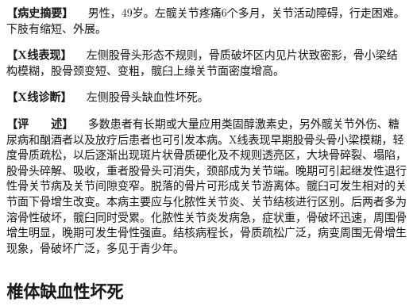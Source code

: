 \textbf{【病史摘要】}
　男性，49岁。左髋关节疼痛6个多月，关节活动障碍，行走困难。下肢有缩短、外展。

\textbf{【X线表现】}
　左侧股骨头形态不规则，骨质破坏区内见片状致密影，骨小梁结构模糊，股骨颈变短、变粗，髋臼上缘关节面密度增高。

\textbf{【X线诊断】} 　左侧股骨头缺血性坏死。

\textbf{【评　　述】}
　多数患者有长期或大量应用类固醇激素史，另外髋关节外伤、糖尿病和酗酒者以及放疗后患者也可引发本病。X线表现早期股骨头骨小梁模糊，轻度骨质疏松，以后逐渐出现斑片状骨质硬化及不规则透亮区，大块骨碎裂、塌陷，股骨头碎解、吸收，重者股骨头可消失，颈部成为关节端。晚期可引起继发性退行性骨关节病及关节间隙变窄。脱落的骨片可形成关节游离体。髋臼可发生相对的关节面下骨增生改变。本病主要应与化脓性关节炎、关节结核进行区别。后两者多为溶骨性破坏，髋臼同时受累。化脓性关节炎发病急，症状重，骨破坏迅速，周围骨增生明显，晚期可发生骨性强直。结核病程长，骨质疏松广泛，病变周围无骨增生现象，骨破坏广泛，多见于青少年。

\subsection{椎体缺血性坏死}

